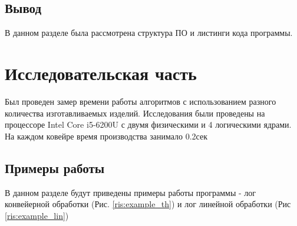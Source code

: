 \documentclass[12pt]{report}
\begin{document}
\section{Вывод}
В данном разделе была рассмотрена структура ПО и листинги кода программы.

\chapter{Исследовательская часть}
Был проведен замер времени работы алгоритмов с использованием разного количества изготавливаемых изделий.
Исследования были проведены на процессоре Intel Core i5-6200U с двумя физическими и 4 логическими ядрами.
На каждом ковейре время производства занимало 0.2сек
\section{Примеры работы}
В данном разделе будут приведены примеры работы программы - лог конвейерной обработки (Рис. \ref{ris:example_th}) и лог линейной обработки (Рис \ref{ris:example_lin})
\end{document}
